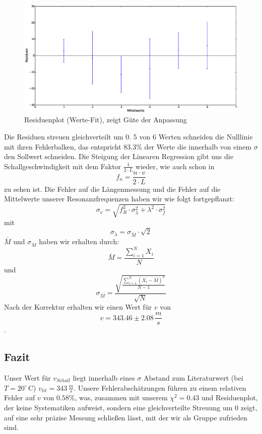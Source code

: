 \documentclass[12pt,a4paper]{article}
\begin{document}
\begin{figure}[H]
\centering
\includegraphics[scale=0.3]{Bilder/Residuen_Variation_Frequenzen.eps}
\caption{Residuenplot (Werte-Fit), zeigt Güte der Anpassung}
\end{figure}
Die Residuen streuen gleichverteilt um 0. 5 von 6 Werten schneiden die Nulllinie mit ihren Fehlerbalken, das entspricht $83.3\%$ der Werte die innerhalb von einem $\sigma$ den Sollwert schneiden. 
Die Steigung der Linearen Regression gibt uns die Schallgeschwindigkeit mit dem Faktor $\frac{1}{2\cdot L}$ wieder, wie auch schon in
\begin{equation}
f_n = \frac{n\cdot v}{2\cdot L}
\end{equation}
zu sehen ist.
Die Fehler auf die Längenmessung und die Fehler auf die Mittelwerte unserer Resonanzfrequenzen haben wir wie folgt fortgepflanzt:
\begin{equation}
\sigma_v = \sqrt{f_R^2\cdot\sigma_{\lambda}^2 + \lambda^2\cdot\sigma_f^2}
\end{equation}
mit
\begin{equation}
\sigma_{\lambda} = \sigma_{\bar{M}}\cdot\sqrt{2}
\end{equation}
$\bar{M}$ und $\sigma_{\bar{M}}$ haben wir erhalten durch:
\begin{equation}
\bar{M} = \frac{\sum_{i=1}^{N}{X_i}}{N}
\end{equation}
und
\begin{equation}
\sigma_{\bar{M}}=\frac{\sqrt{\frac{\sum_{i=1}^{N}({X_i-\bar{M}})^2}{N-1}}}{\sqrt{N}}
\end{equation}
Nach der Korrektur erhalten wir einen Wert für $v$ von
\begin{equation}
v = 343.46 \pm 2.08\,\frac{m}{s}
\end{equation}.

\subsection{Fazit}
Unser Wert für $v_{Schall}$ liegt innerhalb eines $\sigma$ Abstand zum Literaturwert (bei $T = 20^{\circ}\,$C) $v_{lit}=343\,\frac{m}{s}$. Unsere Fehlerabschätzungen führen zu einem relativen Fehler auf $v$ von $0.58\%$, was, zusammen mit unserem $\chi^2 = 0.43$ und Residuenplot, der keine Systematiken aufweist, sondern eine gleichverteilte Streuung um 0 zeigt, auf eine sehr präzise Messung schließen lässt, mit der wir als Gruppe zufrieden sind.
\newpage
\end{document}
